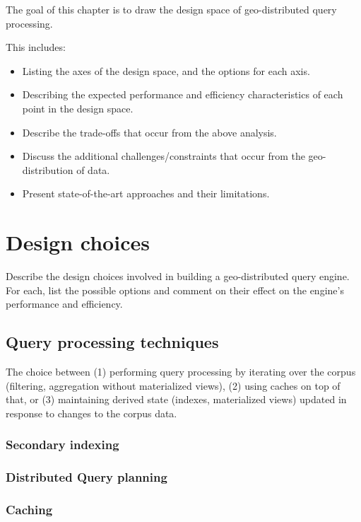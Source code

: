 The goal of this chapter is to draw the design space of geo-distributed query processing.

This includes:
\begin{itemize}
  \item Listing the axes of the design space, and the options for each axis.
  \item Describing the expected performance and efficiency characteristics
  of each point in the design space.
  \item Describe the trade-offs that occur from the above analysis.
  \item Discuss the additional challenges/constraints that occur from the geo-
  distribution of data.
  \item Present state-of-the-art approaches and their limitations.
\end{itemize}

\section{Design choices}
Describe the design choices involved in building a geo-distributed query engine.
For each, list the possible options and comment on their effect on the engine's
performance and efficiency.


\subsection{Query processing techniques}

The choice between (1) performing query processing by iterating over the corpus
(filtering, aggregation without materialized views), (2) using caches on top of
that, or (3) maintaining derived state (indexes, materialized views) updated in
response to changes to the corpus data.


\subsubsection{Secondary indexing}

\subsubsection{Distributed Query planning}

\subsubsection{Caching}


